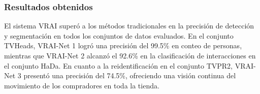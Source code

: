 \subsubsection{Resultados obtenidos}
El sistema VRAI superó a los métodos tradicionales en la precisión de detección y segmentación en todos los conjuntos de datos evaluados. En el conjunto TVHeads, VRAI-Net 1 logró una precisión del 99.5\% en conteo de personas, mientras que VRAI-Net 2 alcanzó el 92.6\% en la clasificación de interacciones en el conjunto HaDa. En cuanto a la reidentificación en el conjunto TVPR2, VRAI-Net 3 presentó una precisión del 74.5\%, ofreciendo una visión continua del movimiento de los compradores en toda la tienda.







    





